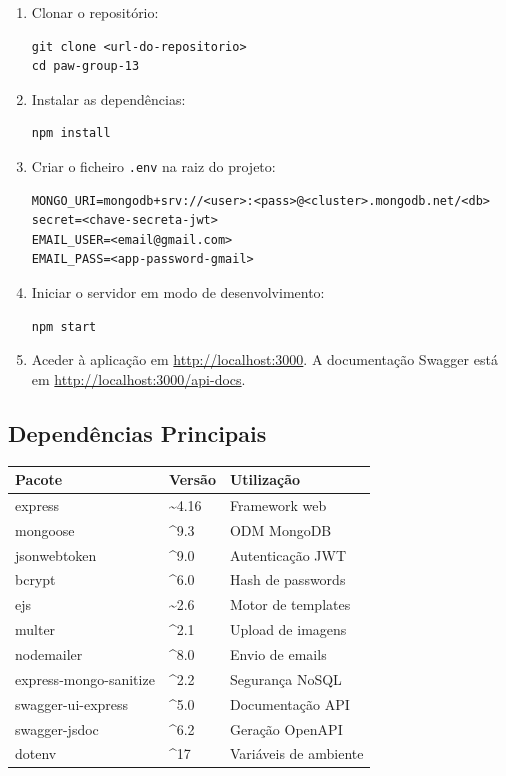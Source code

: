 \documentclass[12pt,a4paper]{article}
\begin{document}
\begin{enumerate}
  \item Clonar o repositório:
\begin{lstlisting}
git clone <url-do-repositorio>
cd paw-group-13
\end{lstlisting}

  \item Instalar as dependências:
\begin{lstlisting}
npm install
\end{lstlisting}

  \item Criar o ficheiro \texttt{.env} na raiz do projeto:
\begin{lstlisting}
MONGO_URI=mongodb+srv://<user>:<pass>@<cluster>.mongodb.net/<db>
secret=<chave-secreta-jwt>
EMAIL_USER=<email@gmail.com>
EMAIL_PASS=<app-password-gmail>
\end{lstlisting}

  \item Iniciar o servidor em modo de desenvolvimento:
\begin{lstlisting}
npm start
\end{lstlisting}

  \item Aceder à aplicação em \url{http://localhost:3000}. A documentação Swagger está em \url{http://localhost:3000/api-docs}.
\end{enumerate}

\subsection{Dependências Principais}

\begin{center}
\begin{tabular}{lll}
\toprule
\textbf{Pacote} & \textbf{Versão} & \textbf{Utilização} \\
\midrule
express               & \textasciitilde4.16 & Framework web \\
mongoose              & \textasciicircum9.3 & ODM MongoDB \\
jsonwebtoken          & \textasciicircum9.0 & Autenticação JWT \\
bcrypt                & \textasciicircum6.0 & Hash de passwords \\
ejs                   & \textasciitilde2.6  & Motor de templates \\
multer                & \textasciicircum2.1 & Upload de imagens \\
nodemailer            & \textasciicircum8.0 & Envio de emails \\
express-mongo-sanitize & \textasciicircum2.2 & Segurança NoSQL \\
swagger-ui-express    & \textasciicircum5.0 & Documentação API \\
swagger-jsdoc         & \textasciicircum6.2 & Geração OpenAPI \\
dotenv                & \textasciicircum17  & Variáveis de ambiente \\
\bottomrule
\end{tabular}
\end{center}
\end{document}
